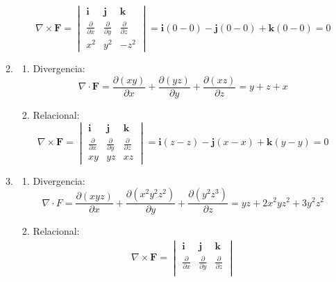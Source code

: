 \begin{enumerate}[label=\color{red}\textbf{\arabic*)}]
\begin{enumerate}[label=\color{red}\textbf{\alph*)}]
\begin{enumerate}[label=\arabic*)]
                  \[
                  \nabla \times \mathbf{F} =\begin{vmatrix} 
                    \mathbf{i}  & \mathbf{j} &\mathbf{k} \\
                    \frac{\partial }{\partial x} & \frac{\partial }{\partial y} & \frac{\partial }{\partial z} \\
                    x^2 & y^2 & -z^2
                  \end{vmatrix} =\mathbf{i} (0-0)-\mathbf{j} (0-0)+\mathbf{k} (0-0)=0
                  \] 
              \end{enumerate}
      \item {} 
        \begin{enumerate}[label=\arabic*)]
          \item Divergencia:
            \[
            \nabla \cdot \mathbf{F} =\frac{\partial (xy)}{\partial x} +\frac{\partial (yz)}{\partial y} +\frac{\partial (xz)}{\partial z} =y+z+x
            \] 
          \item Relacional:
            \[
            \nabla \times \mathbf{F} =\begin{vmatrix} 
              \mathbf{i} & \mathbf{j} & \mathbf{k} \\
              \frac{\partial }{\partial x} & \frac{\partial }{\partial y} & \frac{\partial }{\partial z} \\
              xy & yz & xz
            \end{vmatrix} =\mathbf{i} (z-z)-\mathbf{j} (x-x)+\mathbf{k} (y-y)=0
            \] 
        \end{enumerate}
      \item {} 
      \begin{enumerate}[label=\arabic*)]
                \item Divergencia:
                  \[
                  \nabla \cdot F = \frac{\partial (xyz)}{\partial x} +\frac{\partial (x^2y^2z^2)}{\partial y} +\frac{\partial (y^2z^3)}{\partial z} =yz+2x^2yz^2+3y^2z^2
                  \] 
                \item Relacional:
                  \[
                  \begin{aligned}
                  \nabla \times \mathbf{F} =\begin{vmatrix} 
                    \mathbf{i}  & \mathbf{j} & \mathbf{k} \\
                    \frac{\partial }{\partial x} & \frac{\partial }{\partial y}  & \frac{\partial }{\partial z} \\

\end{vmatrix}
\end{aligned}\]
\end{enumerate}
\end{enumerate}
\end{enumerate}
